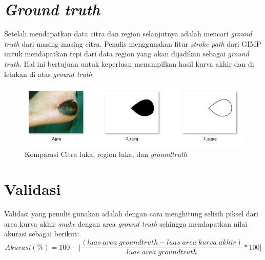 \section{\emph{Ground truth}}
Setelah mendapatkan data citra dan region selanjutnya adalah mencari \emph{ground truth} dari masing masing citra. Penulis menggunakan fitur \emph{stroke path} dari GIMP untuk mendapatkan tepi dari data region yang akan dijadikan sebagai \emph{ground truth}. Hal ini bertujuan untuk keperluan menampilkan hasil kurva akhir dan di letakan di atas \emph{ground truth}
\begin{figure}[H]
	\centering
	\includegraphics[width=1\textwidth]{gambar/citra_gt}
	\caption{Komparasi Citra luka, region luka, dan \emph{groundtruth}}
	\label{Gambar:citra_gt}
\end{figure}


\section{Validasi}
Validasi yang penulis gunakan adalah dengan cara menghitung selisih piksel dari area kurva akhir \emph{snake} dengan area \emph{ground truth} sehingga mendapatkan nilai akurasi sebagai berikut:
\begin{equation}
	\label{val}
	Akurasi (\%) = 100 - \bigg| \frac{ ( luas \; area \; groundtruth - luas \; area \; kurva \; akhir ) }{luas \; area \; groundtruth} * 100 \bigg|
\end{equation}




